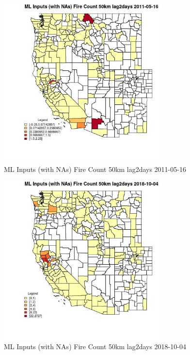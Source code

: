 \begin{figure} 
\centering  
\includegraphics[width=0.77\textwidth]{Code_Outputs/Report_ML_input_PM25_Step4_part_f_de_duplicated_aveswNAs_CountyFire_Count_50km_lag2daysMean2011-05-16.jpg} 
\caption{\label{fig:Report_ML_input_PM25_Step4_part_f_de_duplicated_aveswNAsCountyFire_Count_50km_lag2daysMean2011-05-16}ML Inputs (with NAs) Fire Count 50km lag2days 2011-05-16} 
\end{figure} 
 

\begin{figure} 
\centering  
\includegraphics[width=0.77\textwidth]{Code_Outputs/Report_ML_input_PM25_Step4_part_f_de_duplicated_aveswNAs_CountyFire_Count_50km_lag2daysMean2018-10-04.jpg} 
\caption{\label{fig:Report_ML_input_PM25_Step4_part_f_de_duplicated_aveswNAsCountyFire_Count_50km_lag2daysMean2018-10-04}ML Inputs (with NAs) Fire Count 50km lag2days 2018-10-04} 
\end{figure} 
 

